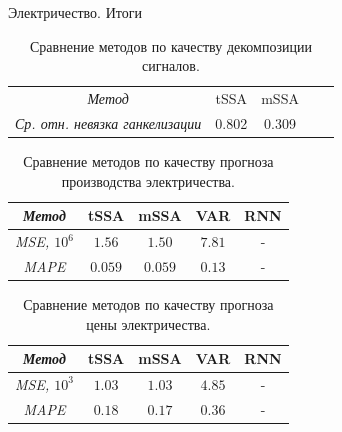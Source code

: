 	\begin{frame}{Электричество. Итоги}
		
		\begin{table}[h]
			\caption{Сравнение методов по качеству декомпозиции сигналов.}
			\begin{tabular}{lllll}
				\cline{1-3}
				\multicolumn{1}{|c|}{\textit{Метод}}                        & \multicolumn{1}{c|}{tSSA}  & \multicolumn{1}{c|}{mSSA}  &  &  \\ \cline{1-3}
				\multicolumn{1}{|c|}{\textit{Ср. отн. невязка ганкелизации}} & \multicolumn{1}{c|}{0.802} & \multicolumn{1}{c|}{0.309} &  &  \\ \cline{1-3}
			\end{tabular}
		\end{table}
		
		\begin{table}[h]
			\caption{Сравнение методов по качеству прогноза производства электричества.}
			\begin{tabular}{ccccc}
				\hline
				\multicolumn{1}{|c|}{\textit{Метод}} & \multicolumn{1}{c|}{tSSA} & \multicolumn{1}{c|}{mSSA} & \multicolumn{1}{c|}{VAR} & \multicolumn{1}{c|}{RNN} \\ \hline
				\multicolumn{1}{|c|}{\textit{MSE, $10^6$}}   & \multicolumn{1}{c|}{$1.56$}     & \multicolumn{1}{c|}{$1.50$}     & \multicolumn{1}{c|}{$7.81$}    & \multicolumn{1}{c|}{-}    \\ \hline
				\multicolumn{1}{|c|}{\textit{MAPE}}  & \multicolumn{1}{c|}{$0.059$}     & \multicolumn{1}{c|}{$0.059$}     & \multicolumn{1}{c|}{$0.13$}    & \multicolumn{1}{c|}{-}    \\ \hline
			\end{tabular}
		\end{table}
		
		\begin{table}[h]
			\caption{Сравнение методов по качеству прогноза цены электричества.}
			\begin{tabular}{ccccc}
				\hline
				\multicolumn{1}{|c|}{\textit{Метод}} & \multicolumn{1}{c|}{tSSA} & \multicolumn{1}{c|}{mSSA} & \multicolumn{1}{c|}{VAR} & \multicolumn{1}{c|}{RNN} \\ \hline
				\multicolumn{1}{|c|}{\textit{MSE, $10^3$}}   & \multicolumn{1}{c|}{$1.03$}     & \multicolumn{1}{c|}{$1.03$}     & \multicolumn{1}{c|}{$4.85$}    & \multicolumn{1}{c|}{-}    \\ \hline
				\multicolumn{1}{|c|}{\textit{MAPE}}  & \multicolumn{1}{c|}{$0.18$}     & \multicolumn{1}{c|}{$0.17$}     & \multicolumn{1}{c|}{$0.36$}    & \multicolumn{1}{c|}{-}    \\ \hline   
			\end{tabular}
		\end{table}

	\end{frame}

	
	
